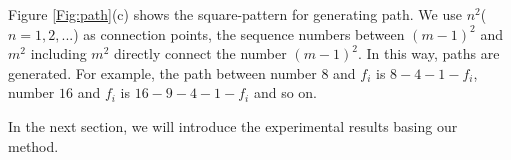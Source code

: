  Figure \ref{Fig:path}(c) shows the square-pattern for generating path.
 We use $n^2$($ n = 1, 2,...$) as connection points, the sequence numbers between $(m-1)^2$ and $m^2$ including $m^2$ directly connect the number $(m-1)^2$.
 In this way, paths are generated.
 For example, the path between number $8$ and $f_i$ is $8-4-1-f_i$, number $16$ and $f_i$ is $16-9-4-1-f_i$ and so on.

 In the next section, we will introduce the experimental results basing our method.